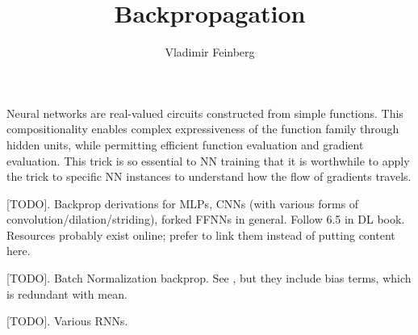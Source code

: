\documentclass{article}
\title{Backpropagation}
\author{Vladimir Feinberg}
\begin{document}
\maketitle

Neural networks are real-valued circuits constructed from simple functions. This compositionality enables complex expressiveness of the function family through hidden units, while permitting efficient function evaluation and gradient evaluation. This trick is so essential to NN training that it is worthwhile to apply the trick to specific NN instances to understand how the flow of gradients travels.

[TODO]. Backprop derivations for MLPs, CNNs (with various forms of convolution/dilation/striding), forked FFNNs in general. Follow 6.5 in DL book. Resources probably exist online; prefer to link them instead of putting content here.

[TODO]. Batch Normalization backprop. See , but they include bias terms, which is redundant with mean.

[TODO]. Various RNNs.
\end{document}
